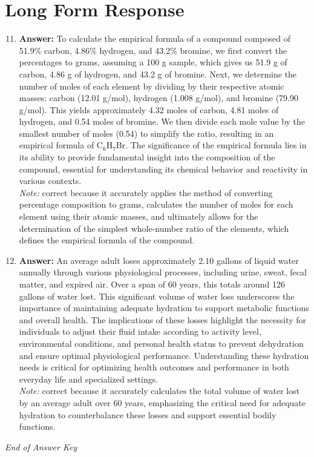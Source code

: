 \documentclass[12pt]{article}
\begin{document}
\section*{Long Form Response}
\begin{enumerate}[label=\arabic*.]
\setcounter{enumi}{10}
\item \textbf{Answer:} To calculate the empirical formula of a compound composed of 51.9\% carbon, 4.86\% hydrogen, and 43.2\% bromine, we first convert the percentages to grams, assuming a 100 g sample, which gives us 51.9 g of carbon, 4.86 g of hydrogen, and 43.2 g of bromine. Next, we determine the number of moles of each element by dividing by their respective atomic masses: carbon (12.01 g/mol), hydrogen (1.008 g/mol), and bromine (79.90 g/mol). This yields approximately 4.32 moles of carbon, 4.81 moles of hydrogen, and 0.54 moles of bromine. We then divide each mole value by the smallest number of moles (0.54) to simplify the ratio, resulting in an empirical formula of C$_{6}$H$_{7}$Br. The significance of the empirical formula lies in its ability to provide fundamental insight into the composition of the compound, essential for understanding its chemical behavior and reactivity in various contexts.
\\ \textit{Note:} correct because it accurately applies the method of converting percentage composition to grams, calculates the number of moles for each element using their atomic masses, and ultimately allows for the determination of the simplest whole-number ratio of the elements, which defines the empirical formula of the compound.
\item \textbf{Answer:} An average adult loses approximately 2.10 gallons of liquid water annually through various physiological processes, including urine, sweat, fecal matter, and expired air. Over a span of 60 years, this totals around 126 gallons of water lost. This significant volume of water loss underscores the importance of maintaining adequate hydration to support metabolic functions and overall health. The implications of these losses highlight the necessity for individuals to adjust their fluid intake according to activity level, environmental conditions, and personal health status to prevent dehydration and ensure optimal physiological performance. Understanding these hydration needs is critical for optimizing health outcomes and performance in both everyday life and specialized settings.
\\ \textit{Note:} correct because it accurately calculates the total volume of water lost by an average adult over 60 years, emphasizing the critical need for adequate hydration to counterbalance these losses and support essential bodily functions.
\end{enumerate}

\vfill
\noindent\textit{End of Answer Key}
\end{document}
